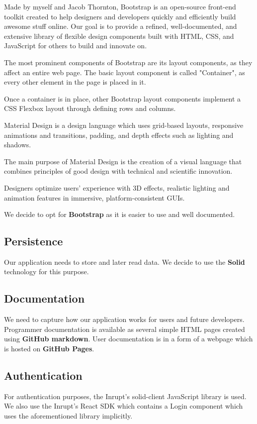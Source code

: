   Made by myself and Jacob Thornton, Bootstrap is an open-source front-end toolkit created to help designers and developers quickly and efficiently build awesome stuff online. Our goal is to provide a refined, well-documented, and extensive library of flexible design components built with HTML, CSS, and JavaScript for others to build and innovate on.

  The most prominent components of Bootstrap are its layout components, as they affect an entire web page. The basic layout component is called "Container", as every other element in the page is placed in it.

  Once a container is in place, other Bootstrap layout components implement a CSS Flexbox layout through defining rows and columns.

  Material Design is a design language which uses grid-based layouts, responsive animations and transitions, padding, and depth effects such as lighting and shadows.

  The main purpose of Material Design is the creation of a visual language that combines principles of good design with technical and scientific innovation. 

  Designers optimize users' experience with 3D effects, realistic lighting and animation features in immersive, platform-consistent GUIs.

  We decide to opt for \textbf{Bootstrap} as it is easier to use and well documented.

\subsection*{Persistence}
Our application needs to store and later read data.
We decide to use the \textbf{Solid} technology for this purpose. 

\subsection*{Documentation}
We need to capture how our application works for users and future developers.
Programmer documentation is available as several simple HTML pages created using \textbf{GitHub markdown}.
User documentation is in a form of a webpage which is hosted on \textbf{GitHub Pages}.

\subsection*{Authentication}
For authentication purposes, the Inrupt's solid-client JavaScript library is used.
We also use the Inrupt's React SDK which contains a Login component which uses the aforementioned library implicitly.

